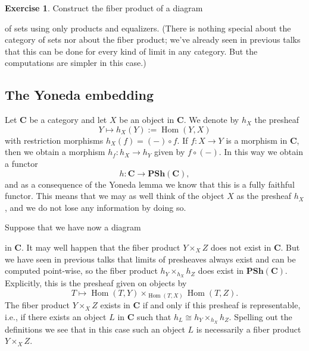 \documentclass[12pt,a4paper]{amsart}
\theoremstyle{plain}
\theoremstyle{definition}
\newtheorem{xca}[thm]{Exercise}
\theoremstyle{remark}
\begin{document}
\begin{xca}
  Construct the fiber product of a diagram
  \begin{center}
  \end{center}
  of sets using only products and equalizers.
  (There is nothing special about the category of sets nor about the fiber product; we've already seen in previous talks that this can be done for every kind of limit in any category.
  But the computations are simpler in this case.)
\end{xca}

\subsection{The Yoneda embedding}

Let $\mathbf{C}$ be a category and let $X$ be an object in $\mathbf{C}$.
We denote by $h_{X}$ the presheaf
\[ Y \mapsto h_{X}(Y) := \operatorname{Hom}(Y,X) \]
with restriction morphisms $h_{X}(f) = (-) \circ f$.
If $f \colon X \to Y$ is a morphism in $\mathbf{C}$, then we obtain a morphism $h_{f} \colon h_{X} \to h_{Y}$ given by $f \circ (-)$.
In this way we obtain a functor
\[ h \colon \mathbf{C} \to \mathbf{PSh}(\mathbf{C}), \]
and as a consequence of the Yoneda lemma we know that this is a fully faithful functor.
This means that we may as well think of the object $X$ as the presheaf $h_{X}$, and we do not lose any information by doing so.

Suppose that we have now a diagram
\begin{center}
\end{center}
in $\mathbf{C}$.
It may well happen that the fiber product $Y \times_{X} Z$ does not exist in $\mathbf{C}$.
But we have seen in previous talks that limits of presheaves always exist and can be computed point-wise, so the fiber product $h_{Y} \times_{h_{X}} h_{Z}$ does exist in $\mathbf{PSh}(\mathbf{C})$.
Explicitly, this is the presheaf given on objects by
\[ T \mapsto \operatorname{Hom}(T,Y) \times_{\operatorname{Hom}(T,X)} \operatorname{Hom}(T,Z). \]
The fiber product $Y \times_{X} Z$ exists in $\mathbf{C}$ if and only if this presheaf is representable, i.e., if there exists an object $L$ in $\mathbf{C}$ such that $h_{L} \cong h_{Y} \times_{h_{X}} h_{Z}$.
Spelling out the definitions we see that in this case such an object $L$ is necessarily a fiber product $Y \times_{X} Z$.
\end{document}
